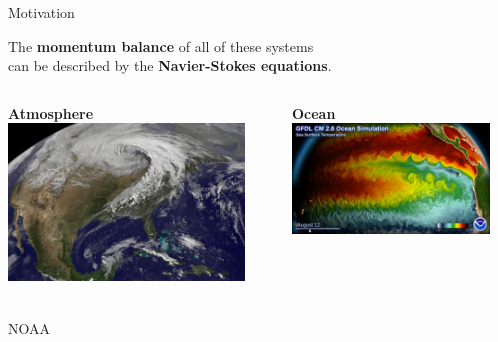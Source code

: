 \documentclass[aspectratio=169,xcolor=dvipsnames]{beamer}
\newcommand\credit[2]{
        \\ \vspace{-0.5em}
        {\color{gray}\scriptsize
        \hfill
        #1
        \hspace{#2}}
        }
\begin{document}
\begin{frame}[t]{Motivation}

    \hspace{2em}The \textbf{momentum balance} of all of these systems \\ 
    \hspace{2em}can be described by the 
    \textbf{Navier-Stokes equations}. 

    \begin{columns}
        \begin{column}{0.32\textwidth}
            \centering
            \hspace{2em}\textbf{Atmosphere}
            \vspace{0.2cm} \newline
            \includegraphics[width=0.9\textwidth]{figs/Fig-MidLatCyclone_2010-10-26_low_pressure.jpg}
            \credit{NOAA}{5pt}
        \end{column}
        \begin{column}{0.36\textwidth}
            \centering
            \hspace{2em}\textbf{Ocean}
            \vspace{0.2cm} \newline
            \includegraphics[width=0.9\textwidth]{figs/Fig-cm2.6-mesoscale-eddies.png}

\end{column}
\end{columns}
\end{frame}
\end{document}
